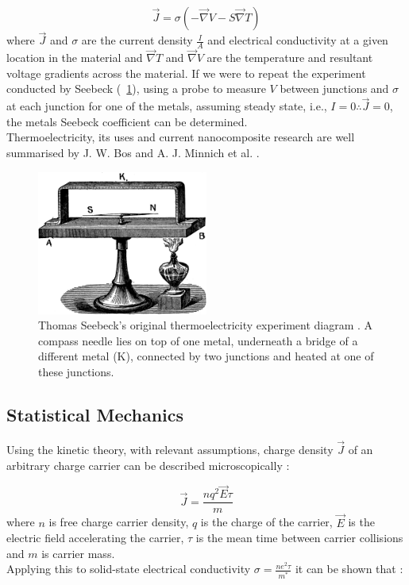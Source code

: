 \documentclass[a4paper,10pt,journal]{IEEEtran}
\newcommand{\figref}[2][\figurename~]{#1\ref{#2}}
\begin{document}
\begin{equation}
\label{current-density}
	\vec{J} = \sigma (-\vec{\nabla} V - S \vec{\nabla} T)
\end{equation}
where $\vec{J}$ and $\sigma$ are the current density $\frac{I}{A}$ and
electrical conductivity at a given location in the material and
$\vec{\nabla} T$ and $\vec{\nabla} V$ are the temperature and
resultant voltage gradients across the material. If we were to repeat the
experiment conducted by Seebeck (\figref{seebeck-experiment}), using a
probe to measure $V$ between junctions and $\sigma$ at each junction
for one of the metals, assuming steady state, i.e., $I=0 \therefore
\vec{J} = 0$, the metals Seebeck coefficient can be determined.\\
Thermoelectricity, its uses and current nanocomposite research are well
summarised by J. W. Bos \cite{bos-review} and A. J. Minnich et al.
\cite{minnich-review}.

\begin{figure}
	\centering
	\includegraphics[width=0.5\textwidth]{seebeck-experiment-black.png}
	\caption{Thomas Seebeck's original thermoelectricity experiment
	diagram \cite{seebeck-original}. A compass needle lies on top of
	one metal, underneath a bridge of a different metal (K), connected
	by two junctions and heated at one of these junctions.}
	\label{seebeck-experiment}
\end{figure}

\subsection{Statistical Mechanics}
Using the kinetic theory, with relevant assumptions, charge density
$\vec{J}$ of an arbitrary charge carrier can be described
microscopically \cite{kittel}:

\begin{equation}
\label{charge-density}
	\vec{J} = \frac{nq^2\vec{E} \tau}{m}
\end{equation}
where $n$ is free charge carrier density, $q$ is the charge of the
carrier, $\vec{E}$ is the electric field accelerating the
carrier, $\tau$ is the mean time between carrier collisions and $m$ is
carrier mass.\\
Applying this to solid-state electrical conductivity $\sigma = \frac{ne^2
\tau}{m^*}$ it can be shown that \cite{ziman}:
\end{document}
